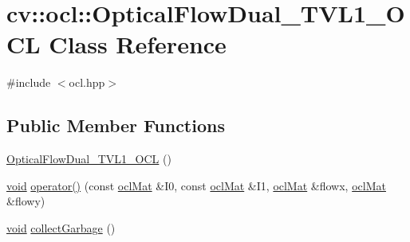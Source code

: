 \hypertarget{classcv_1_1ocl_1_1OpticalFlowDual__TVL1__OCL}{\section{cv\-:\-:ocl\-:\-:Optical\-Flow\-Dual\-\_\-\-T\-V\-L1\-\_\-\-O\-C\-L Class Reference}
\label{classcv_1_1ocl_1_1OpticalFlowDual__TVL1__OCL}
}


{\ttfamily \#include $<$ocl.\-hpp$>$}

\subsection*{Public Member Functions}
\begin{DoxyCompactItemize}
\item 
\hyperlink{classcv_1_1ocl_1_1OpticalFlowDual__TVL1__OCL_aa45ad13ae6835141f5501192656a6dc7}{Optical\-Flow\-Dual\-\_\-\-T\-V\-L1\-\_\-\-O\-C\-L} ()
\item 
\hyperlink{legacy_8hpp_a8bb47f092d473522721002c86c13b94e}{void} \hyperlink{classcv_1_1ocl_1_1OpticalFlowDual__TVL1__OCL_a2c73367af417e9bbfeee1f746be0e23d}{operator()} (const \hyperlink{classcv_1_1ocl_1_1oclMat}{ocl\-Mat} \&I0, const \hyperlink{classcv_1_1ocl_1_1oclMat}{ocl\-Mat} \&I1, \hyperlink{classcv_1_1ocl_1_1oclMat}{ocl\-Mat} \&flowx, \hyperlink{classcv_1_1ocl_1_1oclMat}{ocl\-Mat} \&flowy)
\item 
\hyperlink{legacy_8hpp_a8bb47f092d473522721002c86c13b94e}{void} \hyperlink{classcv_1_1ocl_1_1OpticalFlowDual__TVL1__OCL_ab750836a827928ae605c926fddbe4530}{collect\-Garbage} ()
\end{DoxyCompactItemize}
